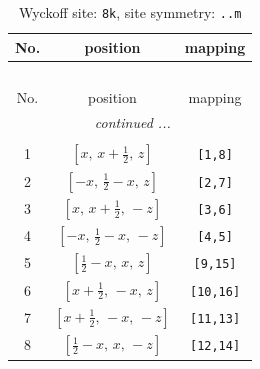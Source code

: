 \documentclass[fleqn,8pt]{jsarticle}
\begin{document}
\begin{longtable}{ccc}
\caption{Wyckoff site: {\tt 8k}, site symmetry: {\tt ..m}}
 \\
 \hline \hline
No. & position & mapping \\ \hline \endfirsthead

\multicolumn{2}{l}{\tablename\ \thetable{}} \\
 \hline \hline
No. & position & mapping \\ \hline \endhead

 \hline \hline
\multicolumn{2}{r}{\footnotesize\it continued ...} \\ \endfoot

 \hline \hline
\multicolumn{2}{r}{} \\ \endlastfoot

1 & $\left[ x,\, x + \frac{1}{2},\, z \right]$ & {\tt [1,8]} \\ \hline
2 & $\left[ - x,\, \frac{1}{2} - x,\, z \right]$ & {\tt [2,7]} \\ \hline
3 & $\left[ x,\, x + \frac{1}{2},\, - z \right]$ & {\tt [3,6]} \\ \hline
4 & $\left[ - x,\, \frac{1}{2} - x,\, - z \right]$ & {\tt [4,5]} \\ \hline
5 & $\left[ \frac{1}{2} - x,\, x,\, z \right]$ & {\tt [9,15]} \\ \hline
6 & $\left[ x + \frac{1}{2},\, - x,\, z \right]$ & {\tt [10,16]} \\ \hline
7 & $\left[ x + \frac{1}{2},\, - x,\, - z \right]$ & {\tt [11,13]} \\ \hline
8 & $\left[ \frac{1}{2} - x,\, x,\, - z \right]$ & {\tt [12,14]} \\
\end{longtable}
\renewcommand{\arraystretch}{1.2}
\end{document}
